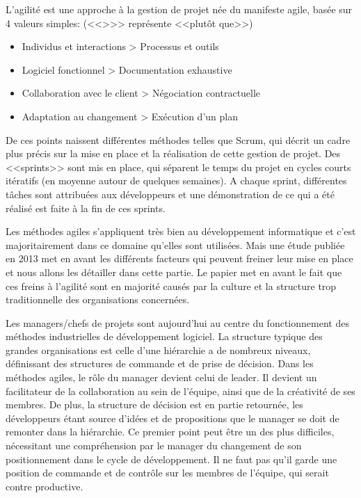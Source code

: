 \documentclass[openany, 11pt]{memoir}
\begin{document}
L'agilité est une approche à la gestion de projet née du manifeste agile, basée sur 4 valeurs simples: (<<{>}>> représente <<plutôt que>>)

\begin{itemize}
	\item Individus et interactions > Processus et outils
	\item Logiciel fonctionnel > Documentation exhaustive
	\item Collaboration avec le client > Négociation contractuelle
	\item Adaptation au changement > Exécution d'un plan
\end{itemize}

De ces points naissent différentes méthodes telles que Scrum, qui décrit un cadre plus précis sur la mise en place et la réalisation de cette gestion de projet. Des <<sprints>> sont mis en place, qui séparent le temps du projet en cycles courts itératifs (en moyenne autour de quelques semaines). A chaque sprint, différentes tâches sont attribuées aux développeurs et une démonstration de ce qui a été réalisé est faite à la fin de ces sprints.

\bigskip
Les méthodes agiles s'appliquent très bien au développement informatique et c'est majoritairement dans ce domaine qu'elles sont utilisées. Mais une étude publiée en 2013 \cite{obstacles} met en avant les différents facteurs qui peuvent freiner leur mise en place et nous allons les détailler dans cette partie. Le papier met en avant le fait que ces freins à l'agilité sont en majorité causés par la culture et la structure trop traditionnelle des organisations concernées.


Les managers/chefs de projets sont aujourd'hui au centre du fonctionnement des méthodes industrielles de développement logiciel. La structure typique des grandes organisations est celle d'une hiérarchie a de nombreux niveaux, définissant des structures de commande et de prise de décision. Dans les méthodes agiles, le rôle du manager devient celui de leader. Il devient un facilitateur de la collaboration au sein de l'équipe, ainsi que de la créativité de ses membres. De plus, la structure de décision est en partie retournée, les développeurs étant source d'idées et de propositions que le manager se doit de remonter dans la hiérarchie. Ce premier point peut être un des plus difficiles, nécessitant une compréhension par le manager du changement de son positionnement dans le cycle de développement. Il ne faut pas qu'il garde une position de commande et de contrôle sur les membres de l'équipe, qui serait contre productive.
\end{document}
